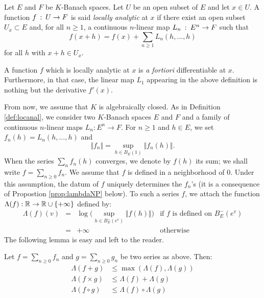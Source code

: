 \documentclass{lms}
\begin{document}
\begin{deftn}
\label{def:locanal}
Let $E$ and $F$ be $K$-Banach spaces. Let $U$ be an open subset of $E$
and let $x \in U$.
A function $f \: : \: U \rightarrow F$ is said \emph{locally analytic} at 
$x$ if there exist an open subset $U_x \subset E$ and, for all $n \ge 
1$, a continuous $n$-linear map $L_n \: : \: E^n \rightarrow F$ such that
$$f(x+h) = f(x) + \sum_{n \geq 1} L_n(h,\ldots,h)$$
for all $h$ with $x + h \in U_x$.
\end{deftn}

\begin{rmk}
A function $f$ which is locally analytic at $x$ is \emph{a fortiori} 
differentiable at $x$. Furthermore, in that case, the linear map $L_1$ 
appearing in the above definition is nothing but the derivative $f'(x)$.
\end{rmk}

From now, we assume that $K$ is algebraically closed. As in Definition 
\ref{def:locanal}, we consider two $K$-Banach spaces $E$ and $F$ and a 
family of continuous $n$-linear maps $L_n : E^n \to F$. For $n \ge 1$ 
and $h \in E$, we set $f_n(h) = L_n(h, \ldots, h)$ and
$$\Vert f_n \Vert = \sup_{h \in B_E(1)} \Vert f_n(h) \Vert.$$
When the series $\sum_n f_n(h)$ converges, we denote by $f(h)$ its sum;
we shall write $f = \sum_{n \geq 0} f_n$. We assume that $f$ is defined
in a neighborhood of $0$. Under this assumption, the datum of $f$ 
uniquely determines the $f_n$'s (it is a consequence of Propostion 
\ref{prop:lambdaNP} below).
To such a series $f$, we attach the function $\Lambda(f) : \mathbb R \to \mathbb R 
\cup \{+\infty\}$ defined by:
$$\begin{array}{rcll}
\Lambda(f)(v) & = & 
\log \big( \sup_{h \in B^-_E(e^v)} \Vert f(h) \Vert \big)
& \text{if } f \text{ is defined on } B^-_E(e^v) \\
& = & +\infty & \text{otherwise}
\end{array}$$
The following lemma is easy and left to the reader.

\begin{lem}
\label{lem:opLambda}
Let $f = \sum_{n \geq 0} f_n$ and $g = \sum_{n \geq 0} g_n$ be two 
series as above. Then:
\begin{align*}
\Lambda(f+g) &\leq \max (\Lambda(f),\Lambda(g)) \\
\Lambda(f \times g) &\leq \Lambda(f)+\Lambda(g) \\
\Lambda(f \circ g) &\leq \Lambda(f) \circ \Lambda(g)
\end{align*}
\end{lem}
\end{document}
